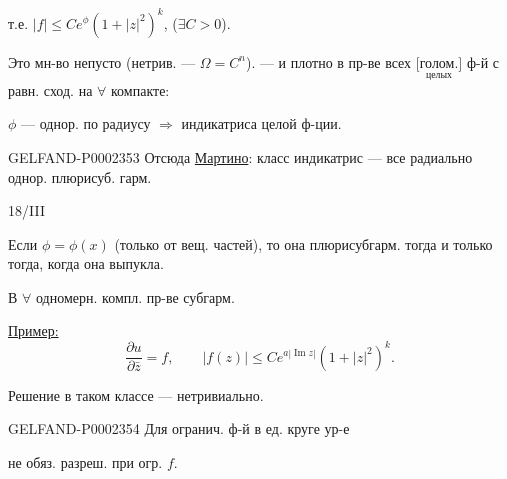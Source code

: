 т.е. $|f|\le Ce^\phi(1+|z|^2)^k$, ($\exists C>0$).



Это мн-во непусто (нетрив. — $\Omega=C^n$). — и плотно в пр-ве всех $\underset{\text{целых}}{\text{[голом.]}}$ ф-й с равн. сход. на $\forall$ компакте:



$\phi$ — однор. по радиусу $\Rightarrow$ индикатриса целой ф-ции.



\begin{GelfandAdjacentEvidence}{GELFAND-P000235}{3}
Отсюда \underline{Мартино}: класс индикатрис — все радиально однор. плюрисуб. гарм.



\end{GelfandAdjacentEvidence}

18/III



Если $\phi=\phi(x)$ (только от вещ. частей), то она плюрисубгарм. тогда и только тогда, когда она выпукла.



В $\forall$ одномерн. компл. пр-ве субгарм.



\underline{Пример:}
\begin{equation*}
 \frac{\partial u}{\partial\bar z}=f,\qquad
 |f(z)|\le Ce^{a|\operatorname{Im}z|}(1+|z|^2)^k.
\end{equation*}



Решение в таком классе — нетривиально.



\begin{GelfandAdjacentEvidence}{GELFAND-P000235}{4}
Для огранич. ф-й в ед. круге ур-е 
\end{GelfandAdjacentEvidence}
 не обяз. разреш.
при огр. $f$.



